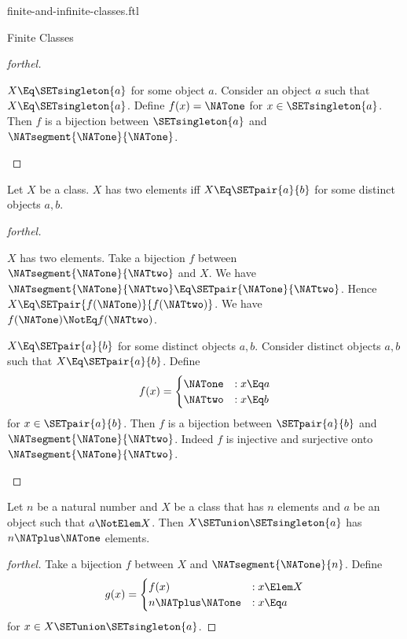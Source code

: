 \documentclass{stex}
\begin{document}
\begin{smodule}{finite-and-infinite-classes.ftl}
\begin{sfragment}{Finite Classes}
\begin{proof}[forthel]
    \begin{case}{$X \Eq \SETsingleton{a}$ for some object $a$.}
      Consider an object $a$ such that $X \Eq \SETsingleton{a}$.
      Define $f(x) = \NATone$ for $x \in \SETsingleton{a}$.
      Then $f$ is a bijection between $\SETsingleton{a}$ and $\NATsegment{\NATone}{\NATone}$.
    \end{case}
  \end{proof}

  \begin{proposition}[forthel]
    Let $X$ be a class.
    $X$ has two elements iff $X \Eq \SETpair{a}{b}$ for some distinct objects $a, b$.
  \end{proposition}
  \begin{proof}[forthel]
    \begin{case}{$X$ has two elements.}
      Take a bijection $f$ between $\NATsegment{\NATone}{\NATtwo}$ and $X$.
      We have $\NATsegment{\NATone}{\NATtwo} \Eq \SETpair{\NATone}{\NATtwo}$.
      Hence $X \Eq \SETpair{f(\NATone)}{f(\NATtwo)}$.
      We have $f(\NATone) \NotEq f(\NATtwo)$.
    \end{case}

    \begin{case}{$X \Eq \SETpair{a}{b}$ for some distinct objects $a, b$.}
      Consider distinct objects $a, b$ such that $X \Eq \SETpair{a}{b}$.
      Define \[f(x) =
        \begin{cases}
          \NATone & : x \Eq a \\
          \NATtwo & : x \Eq b
        \end{cases}\]
      for $x \in \SETpair{a}{b}$.
      Then $f$ is a bijection between $\SETpair{a}{b}$ and $\NATsegment{\NATone}{\NATtwo}$.
      Indeed $f$ is injective and surjective onto $\NATsegment{\NATone}{\NATtwo}$.
    \end{case}
  \end{proof}

  \begin{proposition}[forthel]
    Let $n$ be a natural number and $X$ be a class that has $n$ elements and $a$ be an object such that $a \NotElem X$.
    Then $X \SETunion \SETsingleton{a}$ has $n \NATplus \NATone$ elements.
  \end{proposition}
  \begin{proof}[forthel]
    Take a bijection $f$ between $X$ and $\NATsegment{\NATone}{n}$.
    Define \[g(x) =
      \begin{cases}
        f(x)  & : x \Elem X \\
        n \NATplus \NATone & : x \Eq a
      \end{cases}\]
    for $x \in X \SETunion \SETsingleton{a}$.


\end{proof}
\end{sfragment}
\end{smodule}
\end{document}
